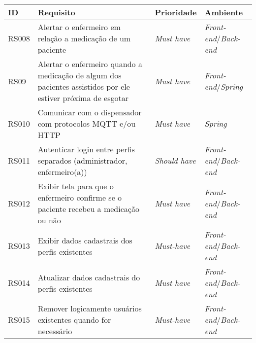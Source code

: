 \begin{table}[H]
    \centering
	\begin{adjustbox}{max width = \textwidth}
        \begin{tabular}{|L{1.5cm}|L{8.5cm}|C{2.5cm}|C{3.5cm}|}
        \hline
        \textbf{ID} & \textbf{Requisito} & \textbf{Prioridade} & \textbf{Ambiente} \\
        \hline
        RS008 & Alertar o enfermeiro em relação a medicação de um paciente & \textit{Must have} & \textit{Front-end}/\textit{Back-end} \\ 
        \hline
        RS09 & Alertar o enfermeiro quando a medicação de algum dos pacientes assistidos por ele estiver próxima de esgotar & \textit{Must have} & \textit{Front-end}/\textit{Spring} \\
        \hline
        RS010 & Comunicar com o dispensador com protocolos MQTT e/ou HTTP & \textit{Must have} & \textit{Spring} \\ 
        \hline
        RS011 & Autenticar login entre perfis separados (administrador, enfermeiro(a)) & \textit{Should have} & \textit{Front-end}/\textit{Back-end} \\ 
        \hline
        RS012 & Exibir tela para que o enfermeiro confirme se o paciente recebeu a medicação ou não & \textit{Must have} & \textit{Front-end}/\textit{Back-end} \\ \hline
        RS013 & Exibir dados cadastrais dos perfis existentes & \textit{Must-have} & \textit{Front-end}/\textit{Back-end} \\ \hline
        RS014 & Atualizar dados cadastrais do perfis existentes & \textit{Must have} & \textit{Front-end}/\textit{Back-end} \\ \hline
        RS015 & Remover logicamente usuários existentes quando for necessário & \textit{Must-have} & \textit{Front-end}/\textit{Back-end} \\ \hline
        \end{tabular}
	\end{adjustbox}
	\label{tab:req_software_2}
\end{table}

